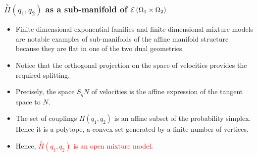\documentclass[xcolor=svgnames]{beamer}
\newcommand{\openplan}[2]{\overset{\circ}\Pi\left(#1,#2\right)}
\newcommand{\rosso}[1]{\textcolor{red}{#1}}
\renewcommand{\emph}{\rosso}
\begin{document}
  \begin{frame}[plain]\small\frametitle{$\openplan {q_1} {q_2}$ as a sub-manifold of $\operatorname{\mathcal E}\left(\Omega_1 \times \Omega_2\right)$}
      
  \begin{itemize}

\item Finite dimensional exponential families and finite-dimensional mixture models are notable examples of sub-manifolds of the affine manifold structure because they are flat in one of the two dual geometries. 

\item Notice that the orthogonal projection on the space of velocities provides the required splitting.

\item Precisely, the space $S_q N$ of velocities is the affine expression of the tangent space to $N$. 

\item The set of couplings $\Pi(q_1,q_2)$ is an affine subset of the probability simplex. Hence it is a polytope, a convex set generated by a finite number of vertices. 

\item Hence, \emph{$\openplan {q_1}{q_2}$ is an open mixture model}. 

\end{itemize}
\end{frame}
\end{document}
